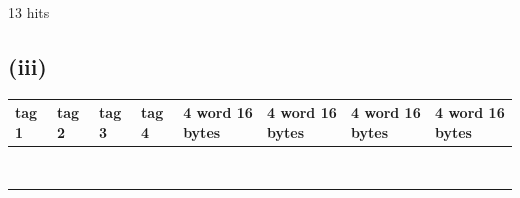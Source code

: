\documentclass{article}
\begin{document}
13 hits
\pagebreak
\subsection{(iii)}


\begin{table}[H]
	\centering

	\label{my-label}
	\begin{tabular}{|l|l|l|l|l|l|l|l|}
		\hline
		tag 1 & tag 2 & tag 3 & tag 4 & 4 word 16 bytes & 4 word 16 bytes & 4 word 16 bytes & 4 word 16 bytes \\
		
		
		
		
		
		
		 \hline
		&       &       &       &                 &                 &                 &                 \\
 & & & & & & & \\
 & & & & & & & \\
 & & & & & & & \\
 
		
		
		
		\hline
		&       &       &       &                 &                 &                 &                 \\
 & & & & & & & \\
 & & & & & & & \\
 & & & & & & & \\
		
		
		 \hline
	\end{tabular}
\end{table}
\end{document}
